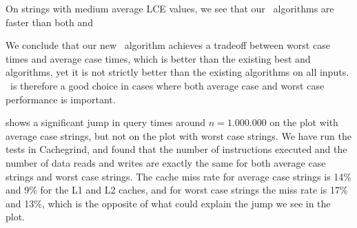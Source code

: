 \documentclass[a4]{article}
\begin{document}
On strings with medium average LCE values, we see that our \fprintk\ algorithms are faster than both  and 

We conclude that our new \fprintk\ algorithm achieves a tradeoff between worst case times and average case times, which is better than the existing best  and  algorithms, yet it is not strictly better than the existing algorithms on all inputs. \fprintk\ is therefore a good choice in cases where both average case and worst case performance is important.


\ifarticle

 shows a significant jump in query times around $n=1.000.000$ on the plot with average case strings, but not on the plot with worst case strings. We have run the tests in Cachegrind, and found that the number of instructions executed and the number of data reads and writes are exactly the same for both average case strings and worst case strings. The cache miss rate for average case strings is 14\% and 9\% for the L1 and L2 caches, and for worst case strings the miss rate is 17\% and 13\%, which is the opposite of what could explain the jump we see in the plot.

\fi %


\ifreport
\end{document}
